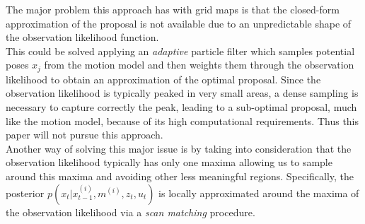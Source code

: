 \documentclass[letterpaper]{article}
\begin{document}
The major problem this approach has with grid maps is that the closed-form approximation of the proposal is not available due to an unpredictable shape of the observation likelihood function.\\ This could be solved applying an \textit{adaptive} particle filter which samples potential poses $x_j$ from the motion model and then weights them through the observation likelihood to obtain an approximation of the optimal proposal. Since the observation likelihood is typically peaked in very small areas, a dense sampling is necessary to capture correctly the peak, leading to a sub-optimal proposal, much like the motion model, because of its high computational requirements. Thus this paper will not pursue this approach.\\
Another way of solving this major issue is by taking into consideration that the observation likelihood typically has only one maxima allowing us to sample around this maxima and avoiding other less meaningful regions. Specifically, the posterior $p(x_t|x_{t-1}^{(i)}, m^{(i)}, z_t, u_t)$ is locally approximated around the maxima of the observation likelihood via a \textit{scan matching} procedure. 
\end{document}
